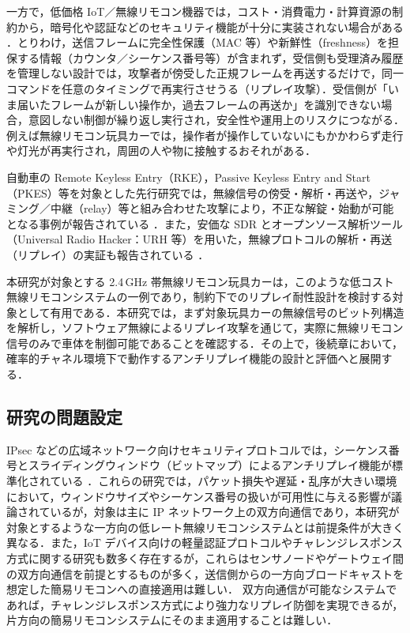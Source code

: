 \documentclass[twocolumn,10pt,a4paper]{jsarticle}
\begin{document}
一方で，低価格 IoT／無線リモコン機器では，コスト・消費電力・計算資源の制約から，暗号化や認証などのセキュリティ機能が十分に実装されない場合がある \cite{Dritsas2025IoTSecurity}．とりわけ，送信フレームに完全性保護（MAC 等）や新鮮性（freshness）を担保する情報（カウンタ／シーケンス番号等）が含まれず，受信側も受理済み履歴を管理しない設計では，攻撃者が傍受した正規フレームを再送するだけで，同一コマンドを任意のタイミングで再実行させうる（リプレイ攻撃）．受信側が「いま届いたフレームが新しい操作か，過去フレームの再送か」を識別できない場合，意図しない制御が繰り返し実行され，安全性や運用上のリスクにつながる．例えば無線リモコン玩具カーでは，操作者が操作していないにもかかわらず走行や灯光が再実行され，周囲の人や物に接触するおそれがある．

自動車の Remote Keyless Entry（RKE），Passive Keyless Entry and Start（PKES）等を対象とした先行研究では，無線信号の傍受・解析・再送や，ジャミング／中継（relay）等と組み合わせた攻撃により，不正な解錠・始動が可能となる事例が報告されている \cite{Francillon2011PKES,Lin2019IndustrialRemote,Garcia2016RKE}．また，安価な SDR とオープンソース解析ツール（Universal Radio Hacker：URH 等）を用いた，無線プロトコルの解析・再送（リプレイ）の実証も報告されている \cite{Anthi2024RFVuln,Mykhaylova2024RCReplay}．

本研究が対象とする 2.4\,GHz 帯無線リモコン玩具カーは，このような低コスト無線リモコンシステムの一例であり，制約下でのリプレイ耐性設計を検討する対象として有用である．本研究では，まず対象玩具カーの無線信号のビット列構造を解析し，ソフトウェア無線によるリプレイ攻撃を通じて，実際に無線リモコン信号のみで車体を制御可能であることを確認する．その上で，後続章において，確率的チャネル環境下で動作するアンチリプレイ機能の設計と評価へと展開する．

\subsection{研究の問題設定}

IPsec などの広域ネットワーク向けセキュリティプロトコルでは，シーケンス番号とスライディングウィンドウ（ビットマップ）によるアンチリプレイ機能が標準化されている \cite{RFC9827,Awaad2014IPsecWindow}．これらの研究では，パケット損失や遅延・乱序が大きい環境において，ウィンドウサイズやシーケンス番号の扱いが可用性に与える影響が議論されているが，対象は主に IP ネットワーク上の双方向通信であり，本研究が対象とするような一方向の低レート無線リモコンシステムとは前提条件が大きく異なる．また，IoT デバイス向けの軽量認証プロトコルやチャレンジレスポンス方式に関する研究も数多く存在するが，これらはセンサノードやゲートウェイ間の双方向通信を前提とするものが多く，送信側からの一方向ブロードキャストを想定した簡易リモコンへの直接適用は難しい．
双方向通信が可能なシステムであれば，チャレンジレスポンス方式により強力なリプレイ防御を実現できるが，片方向の簡易リモコンシステムにそのまま適用することは難しい．
\end{document}

